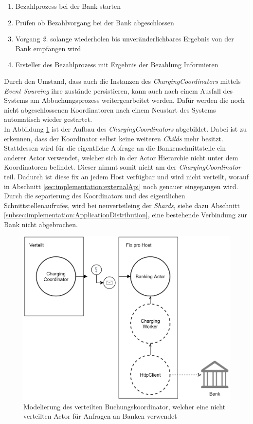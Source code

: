 \begin{enumerate}
    \item Bezahlprozess bei der Bank starten
    \item Prüfen ob Bezahlvorgang bei der Bank abgeschlossen
    \item Vorgang \textit{2.} solange wiederholen bis unveränderlichbares Ergebnis von der Bank empfangen wird
    \item Ersteller des Bezahlprozess mit Ergebnis der Bezahlung Informieren
\end{enumerate}
Durch den Umstand, dass auch die Instanzen des \textit{ChargingCoordinators} mittels \textit{Event Sourcing} ihre zustände persistieren, kann auch nach einem Ausfall des Systems am Abbuchungsprozess weitergearbeitet werden. Dafür werden die noch nicht abgeschlossenen Koordinatoren nach einem Neustart des Systems automatisch wieder gestartet. \\
In Abbildung \ref{fig:implementation:ChargingCoordinatorSample} ist der Aufbau des \textit{ChargingCoordinators} abgebildet. Dabei ist zu erkennen, dass der Koordinator selbst keine weiteren \textit{Childs} mehr besitzt. Stattdessen wird für die eigentliche Abfrage an die Bankenschnittstelle ein anderer Actor verwendet, welcher sich in der Actor Hierarchie nicht unter dem Koordinatoren befindet. Dieser nimmt somit nicht am  der \textit{ChargingCoordinator} teil. Dadurch ist diese fix an jedem Host verfügbar und wird nicht verteilt, worauf in Abschnitt \ref{sec:implementation:externalApi} noch genauer eingegangen wird. Durch die separierung des Koordinators und des eigentlichen Schnittstellenaufrufes, wird bei neuverteileing der \textit{Shards}, siehe dazu Abschnitt \ref{subsec:implementation:ApplicationDistribution}, eine bestehende Verbindung zur Bank nicht abgebrochen. 
\begin{figure}
    \centering
    \includegraphics[width=0.65\linewidth]{gfx/implementation/ChargingCoordinatorSample}
    \caption{Modelierung des verteilten Buchungskoordinator, welcher eine nicht verteilten Actor für Anfragen an Banken verwendet}
    \label{fig:implementation:ChargingCoordinatorSample}
\end{figure}


